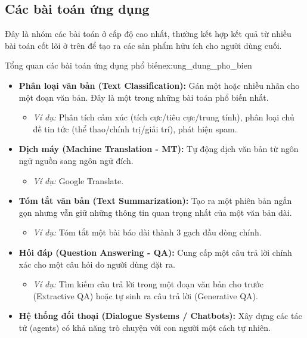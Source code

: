 \subsection{Các bài toán ứng dụng}
\label{ssec:bai_toan_ung_dung}

Đây là nhóm các bài toán ở cấp độ cao nhất, thường kết hợp kết quả từ nhiều bài toán cốt lõi ở trên để tạo ra các sản phẩm hữu ích cho người dùng cuối.

\begin{example}{Tổng quan các bài toán ứng dụng phổ biến}{ex:ung_dung_pho_bien}
    \begin{itemize}
        \item \textbf{Phân loại văn bản (Text Classification):} Gán một hoặc nhiều nhãn cho một đoạn văn bản. Đây là một trong những bài toán phổ biến nhất.
            \begin{itemize}
                \item \textit{Ví dụ:} Phân tích cảm xúc (tích cực/tiêu cực/trung tính), phân loại chủ đề tin tức (thể thao/chính trị/giải trí), phát hiện spam.
            \end{itemize}
        \item \textbf{Dịch máy (Machine Translation - MT):} Tự động dịch văn bản từ ngôn ngữ nguồn sang ngôn ngữ đích.
            \begin{itemize}
                \item \textit{Ví dụ:} Google Translate.
            \end{itemize}
        \item \textbf{Tóm tắt văn bản (Text Summarization):} Tạo ra một phiên bản ngắn gọn nhưng vẫn giữ những thông tin quan trọng nhất của một văn bản dài.
            \begin{itemize}
                \item \textit{Ví dụ:} Tóm tắt một bài báo dài thành 3 gạch đầu dòng chính.
            \end{itemize}
        \item \textbf{Hỏi đáp (Question Answering - QA):} Cung cấp một câu trả lời chính xác cho một câu hỏi do người dùng đặt ra.
            \begin{itemize}
                \item \textit{Ví dụ:} Tìm kiếm câu trả lời trong một đoạn văn bản cho trước (Extractive QA) hoặc tự sinh ra câu trả lời (Generative QA).
            \end{itemize}
        \item \textbf{Hệ thống đối thoại (Dialogue Systems / Chatbots):} Xây dựng các tác tử (agents) có khả năng trò chuyện với con người một cách tự nhiên.

\end{itemize}
\end{example}

